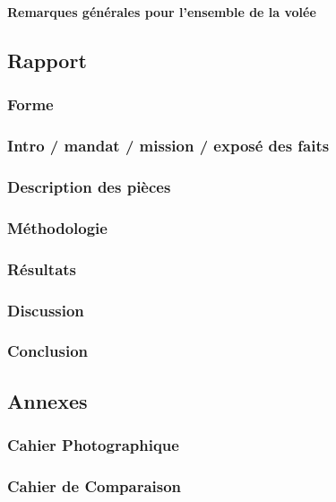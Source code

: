 \documentclass{esc/esc_tp}
\begin{document}
\thispagestyle{esc_tp_firstpage} %

\textbf{Remarques générales pour l’ensemble de la volée}
\lipsum[1]

\hrulefill

\subsection{Rapport}
\subsubsection{Forme}
\lipsum[1]
\subsubsection{Intro / mandat / mission / exposé des faits}
\lipsum[2]
\subsubsection{Description des pièces}
\lipsum[3]
\subsubsection{Méthodologie}
\lipsum[4]
\subsubsection{Résultats}
\lipsum[5]
\subsubsection{Discussion}
\lipsum[6]
\subsubsection{Conclusion}
\lipsum[7]

\subsection{Annexes}
\subsubsection{Cahier Photographique}
\lipsum[8]
\subsubsection{Cahier de Comparaison}
\lipsum[9]
\end{document}
